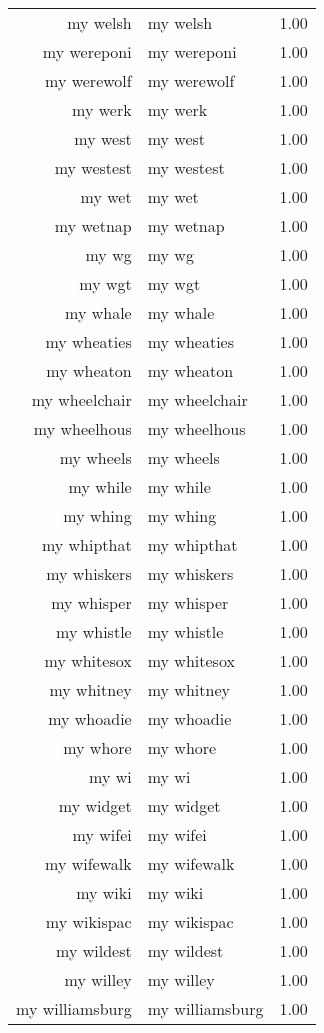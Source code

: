 \begin{table}[ht]
\begin{tabular}{rlr}
  my welsh & my welsh & 1.00 \\ 
  my wereponi & my wereponi & 1.00 \\ 
  my werewolf & my werewolf & 1.00 \\ 
  my werk & my werk & 1.00 \\ 
  my west & my west & 1.00 \\ 
  my westest & my westest & 1.00 \\ 
  my wet & my wet & 1.00 \\ 
  my wetnap & my wetnap & 1.00 \\ 
  my wg & my wg & 1.00 \\ 
  my wgt & my wgt & 1.00 \\ 
  my whale & my whale & 1.00 \\ 
  my wheaties & my wheaties & 1.00 \\ 
  my wheaton & my wheaton & 1.00 \\ 
  my wheelchair & my wheelchair & 1.00 \\ 
  my wheelhous & my wheelhous & 1.00 \\ 
  my wheels & my wheels & 1.00 \\ 
  my while & my while & 1.00 \\ 
  my whing & my whing & 1.00 \\ 
  my whipthat & my whipthat & 1.00 \\ 
  my whiskers & my whiskers & 1.00 \\ 
  my whisper & my whisper & 1.00 \\ 
  my whistle & my whistle & 1.00 \\ 
  my whitesox & my whitesox & 1.00 \\ 
  my whitney & my whitney & 1.00 \\ 
  my whoadie & my whoadie & 1.00 \\ 
  my whore & my whore & 1.00 \\ 
  my wi & my wi & 1.00 \\ 
  my widget & my widget & 1.00 \\ 
  my wifei & my wifei & 1.00 \\ 
  my wifewalk & my wifewalk & 1.00 \\ 
  my wiki & my wiki & 1.00 \\ 
  my wikispac & my wikispac & 1.00 \\ 
  my wildest & my wildest & 1.00 \\ 
  my willey & my willey & 1.00 \\ 
  my williamsburg & my williamsburg & 1.00 \\ 

\end{tabular}
\end{table}

